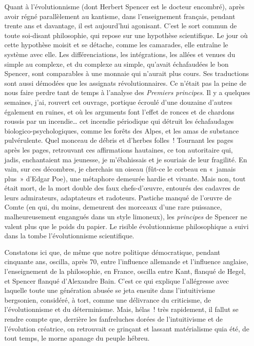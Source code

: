 \documentclass[french,twoside]{book} %
\begin{document}
Quant à l’évolutionnisme (dont Herbert Spencer est le docteur encombré), après avoir régné parallèlement au kantisme, dans l’enseignement français, pendant trente ans et davantage, il est aujourd’hui agonisant. C’est le sort commun de toute soi-disant philosophie, qui repose sur une hypothèse scientifique. Le jour où cette hypothèse moisit et se détache, comme les camarades, elle entraîne le système avec elle. Les différenciations, les intégrations, les allées et venues du simple au complexe, et du complexe au simple, qu’avait échafaudées le bon Spencer, sont comparables à une monnaie qui n’aurait plus cours. Ses traductions sont aussi démodées que les assignats révolutionnaires. Ce n’était pas la peine de nous faire perdre tant de temps à l’analyse des {\itshape Premiers principes}. Il y a quelques semaines, j’ai, rouvert cet ouvrage, portique écroulé d’une douzaine d’autres également en ruines, et où les arguments font l’effet de ronces et de chardons roussis par un incendie… cet incendie périodique qui détruit les échafaudages biologico-psychologiques, comme les forêts des Alpes, et les amas de substance pulvérulente. Quel monceau de débris et d’herbes folles ! Tournant les pages après les pages, retrouvant ces affirmations hautaines, ce ton autoritaire qui, jadis, enchantaient ma jeunesse, je m’ébahissais et je souriais de leur fragilité. En vain, sur ces décombres, je cherchais un oiseau (fût-ce le corbeau en « jamais plus » d’Edgar Poe), une métaphore demeurée hardie et vivante. Mais non, tout était mort, de la mort double des faux chefs-d’œuvre, entourés des cadavres de leurs admirateurs, adaptateurs et radoteurs. Pastiche manqué de l’œuvre de Comte (en qui, du moins, demeurent des morceaux d’une rare puissance, malheureusement engangués dans un style limoneux), les {\itshape principes} de Spencer ne valent plus que le poids du papier. Le risible évolutionnisme philosophique a suivi dans la tombe l’évolutionnisme scientifique.\par
Constatons ici que, de même que notre politique démocratique, pendant cinquante ans, oscilla, après 70, entre l’influence allemande et l’influence anglaise, l’enseignement de la philosophie, en France, oscilla entre Kant, flanqué de Hegel, et Spencer flanqué d’Alexandre Bain. C’est ce qui explique l’allégresse avec laquelle toute une génération abusée se jeta ensuite dans l’intuitivisme bergsonien, considéré, à tort, comme une délivrance du criticisme, de l’évolutionnisme et du déterminisme. Mais, hélas ! très rapidement, il fallut se rendre compte que, derrière les fanfreluches dorées de l’intuitivisme et de l’évolution créatrice, on retrouvait ce grinçant et lassant matérialisme quia été, de tout temps, le morne apanage du peuple hébreu.\par
\end{document}
